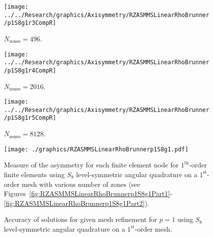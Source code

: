 \documentclass[12pt]{article}
\begin{document}
\begin{sidewaysfigure}[!htb]
\centering
\begin{subfigure}{0.33\textwidth}
\texttt{[image: ../../Research/graphics/Axisymmetry/RZASMMSLinearRhoBrunner/p1S8g1r3CompR]}
\caption{$N_\text{zones}=496$.}
\end{subfigure}%
\begin{subfigure}{0.33\textwidth}
\texttt{[image: ../../Research/graphics/Axisymmetry/RZASMMSLinearRhoBrunner/p1S8g1r4CompR]}
\caption{$N_\text{zones}=2016$.}
\end{subfigure}%
\begin{subfigure}{0.33\textwidth}
\texttt{[image: ../../Research/graphics/Axisymmetry/RZASMMSLinearRhoBrunner/p1S8g1r5CompR]}
\caption{$N_\text{zones}=8128$.}
\end{subfigure}
\caption{Relative asymmetry for $p=1$ finite elements on a $1^\text{st}$-order mesh for $S_8$ level-symmetric angular quadrature for $N_\text{zones}=\{496,2016,8128\}$; mesh overlay may be removed for clarity.}
\label{fig:RZASMMSLinearRhoBrunnerp1S8g1Part2}
\end{sidewaysfigure}

\begin{figure}[!htb]
\centering
\texttt{[image: ./graphics/RZASMMSLinearRhoBrunnerp1S8g1.pdf]}
\caption{Measure of the asymmetry for each finite element node for $1^\text{th}$-order finite elements using $S_8$ level-symmetric angular quadrature on a $1^\text{st}$-order mesh with various number of zones (see Figures~\ref{fig:RZASMMSLinearRhoBrunnerp1S8g1Part1}-\ref{fig:RZASMMSLinearRhoBrunnerp1S8g1Part2}).}
\label{fig:RZASMMSLinearRhoBrunnerp1S8g1Nodes}
\end{figure}

\begin{figure}[!htb]
\centering
{}
\caption{Accuracy of solutions for given mesh refinement for $p=1$ using $S_8$ level-symmetric angular quadrature on a $1^\text{st}$-order mesh.}
\label{fig:RZASMMSLinearRhoBrunnerp1S8g1Accuracy}
\end{figure}
\end{document}
